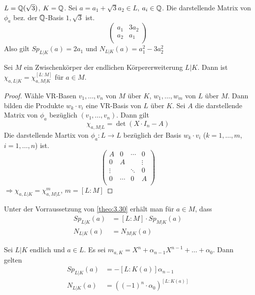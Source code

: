 \documentclass[../main.tex]{subfiles}
\begin{document}
\begin{example}
    $L=\mathbb{Q}(\sqrt{3})$, $K=\mathbb{Q}$.
    Sei $a = a_1+\sqrt{3}a_2\in L$, $a_i \in \mathbb{Q}$.
    Die darstellende Matrix von $\phi_a$ bez. der $\mathbb{Q}$-Basis $1,\sqrt{3}$ ist.
    $$\begin{pmatrix}
        a_1& 3a_2\\
        a_2& a_1\\
    \end{pmatrix}$$
    Also gilt $Sp_{L|K}(a)=2a_1$ und $N_{L|K}(a) = a_1^2-3a_2^2$
\end{example}
\begin{lemma}\label{theo:3.30}
    Sei $M$ ein Zwischenkörper der endlichen Körpererweiterung $L|K$. Dann ist
    $\chi_{a,L|K} = \chi_{a,M|K}^{[L:M]}$ für $a\in M$.
\end{lemma}
\begin{proof}
    Wähle VR-Basen %
    $v_1,\dots,v_n$ von $M$ über $K$,
    $w_1,\dots,w_m$ von $L$ über $M$.
    Dann bilden die Produkte $w_k\cdot v_i$ eine VR-Basis von $L$ über $K$. 
    Sei $A$ die darstellende Matrix von $\phi_a$ bezüglich $(v_1,\dots,v_n)$.
    Dann gilt
    $$\chi_{a,M|L} = \det(X\cdot I_n-A)$$
    Die darstellende Martix von $\phi_a:L\rightarrow L$ bezüglich der Basis $w_k\cdot v_i$ ($k=1,\dots,m$, $i=1,\dots,n$) ist.
    $$\begin{pmatrix}
        A& 0 & \cdots & 0\\
        0& A &   & \vdots\\
        \vdots&  & \ddots & 0\\
        0& \cdots & 0 & A\\
    \end{pmatrix}$$
    $\Rightarrow \chi_{a,L|K} =\chi_{a,M|L}^m$, $m=[L:M]$
\end{proof}
\begin{remark}
    Unter der Vorraussetzung von \ref{theo:3.30} erhält man für $a\in M$, dass 
    \begin{align*}
        Sp_{L|K}(a) &= [L:M]\cdot Sp_{M|K}(a)\\
        N_{L|K}(a) &= N_{M|K}(a)
    \end{align*}
\end{remark}
\begin{theorem} \label{theo:3.32}
    Sei $L|K$ endlich und $a\in L$.
    Es sei $m_{a,K} = X^n+\alpha_{n-1}X^{n-1}+\dots +\alpha_0$.
    Dann gelten
    \begin{align*}
        Sp_{L|K}(a) &= -[L:K(a)]\alpha_{n-1}\\
        N_{L|K} (a) &= \left(\left(-1\right)^n\cdot \alpha_0\right)^{[L:K(a)]}
    \end{align*}
\end{theorem}
\end{document}
